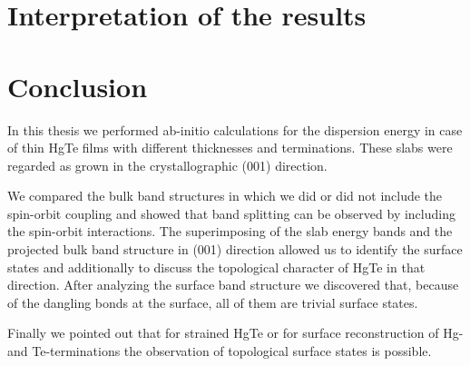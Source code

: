 \documentclass[english, a4, 12pt]{scrartcl}
\begin{document}
\section{Interpretation of the results}	
	
\section{Conclusion}
	In this thesis we performed ab-initio calculations for the dispersion energy in case of thin HgTe films with different thicknesses and terminations. These slabs were regarded as grown in the crystallographic (001) direction.
	
	We compared the bulk band structures in which we did or did not include the spin-orbit coupling and showed that band splitting can be observed by including the spin-orbit interactions.
	The superimposing of the slab energy bands and the projected bulk band structure in (001) direction allowed us to identify the surface states and additionally to discuss the topological character of HgTe in that direction. 
	After analyzing the surface band structure we discovered that, because of the dangling bonds at the surface, all of them are trivial surface states. 
	
	Finally we pointed out that for strained HgTe or for surface reconstruction of Hg- and Te-terminations the observation of topological surface states is possible. 
%	
%	
\newpage
\FloatBarrier
\thispagestyle{empty}
\printbibliography
\end{document}
